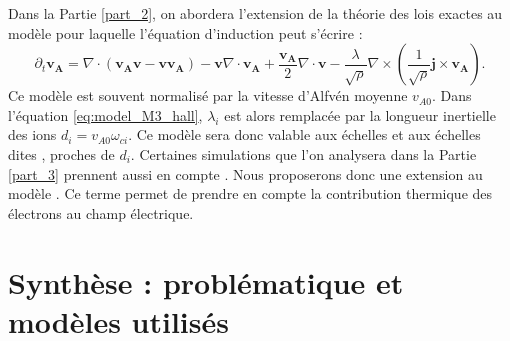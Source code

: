 Dans la Partie \ref{part_2}, on abordera l'extension de la théorie des lois exactes au modèle  pour laquelle l'équation d'induction peut s'écrire :
\begin{equation}
\partial_t \boldsymbol{v_A}  =   \nabla \cdot \left(\boldsymbol{v_A}\boldsymbol{v} - \boldsymbol{v}\boldsymbol{v_A}\right) -  \boldsymbol{v}  \nabla \cdot \boldsymbol{v_A} +  \frac{\boldsymbol{v_A}}{2}  \nabla \cdot \boldsymbol{v} - \frac{\lambda}{ \sqrt{\rho} } \nabla \times\left(\frac{1}{\sqrt{\rho}} \boldsymbol{j}\times \boldsymbol{v_A}\right)  .\label{eq:model_M3_hall}
\end{equation}
Ce modèle est souvent normalisé par la vitesse d'Alfvén moyenne $v_{A0}$. Dans l'équation \eqref{eq:model_M3_hall}, $\lambda_i$ est alors remplacée par la longueur inertielle des ions $d_i = v_{A0}\omega_{ci}$. Ce modèle sera donc valable aux échelles  et aux échelles dites , proches de $d_i$. Certaines simulations que l'on analysera dans la Partie \ref{part_3} prennent aussi en compte . Nous proposerons donc une extension au modèle . Ce terme permet de prendre en compte la contribution thermique des électrons au champ électrique.

\section{Synthèse : problématique et modèles utilisés}
\label{synt-02}

